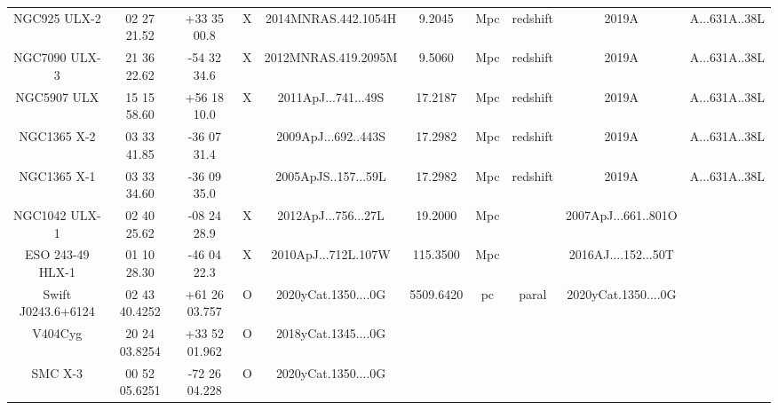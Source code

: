 \begin{table}
\begin{tabular}{ccccccccc}
NGC925 ULX-2 & 02 27 21.52 & +33 35 00.8 & X & 2014MNRAS.442.1054H & 9.2045 & Mpc & redshift & 2019A&A...631A..38L \\
NGC7090 ULX-3 & 21 36 22.62 & -54 32 34.6 & X & 2012MNRAS.419.2095M & 9.5060 & Mpc & redshift & 2019A&A...631A..38L \\
NGC5907 ULX & 15 15 58.60 & +56 18 10.0 & X & 2011ApJ...741...49S & 17.2187 & Mpc & redshift & 2019A&A...631A..38L \\
NGC1365 X-2 & 03 33 41.85 & -36 07 31.4 &  & 2009ApJ...692..443S & 17.2982 & Mpc & redshift & 2019A&A...631A..38L \\
NGC1365 X-1 & 03 33 34.60 & -36 09 35.0 &  & 2005ApJS..157...59L & 17.2982 & Mpc & redshift & 2019A&A...631A..38L \\
NGC1042 ULX-1 & 02 40 25.62 & -08 24 28.9 & X & 2012ApJ...756...27L & 19.2000 & Mpc &  & 2007ApJ...661..801O \\
ESO 243-49 HLX-1 & 01 10 28.30 & -46 04 22.3 & X & 2010ApJ...712L.107W & 115.3500 & Mpc &  & 2016AJ....152...50T \\
Swift J0243.6+6124 & 02 43 40.4252 & +61 26 03.757 & O & 2020yCat.1350....0G & 5509.6420 & pc & paral & 2020yCat.1350....0G \\
V404Cyg & 20 24 03.8254 & +33 52 01.962 & O & 2018yCat.1345....0G &  &  &  &  \\
SMC X-3 & 00 52 05.6251 & -72 26 04.228 & O & 2020yCat.1350....0G &  &  &  &  \\
\end{tabular}
\end{table}
